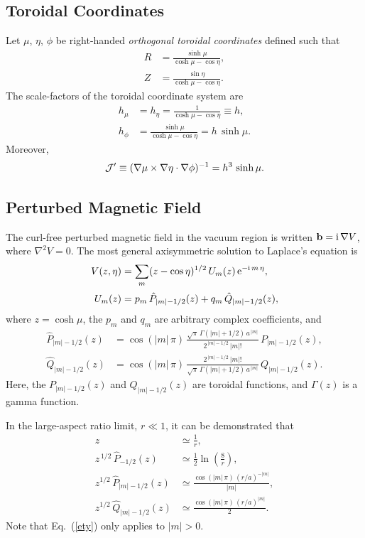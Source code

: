 \documentclass[12pt,prb,aps]{revtex4-1}
\begin{document}
\subsection{Toroidal Coordinates}
Let $\mu$, $\eta$, $\phi$ be right-handed {\em orthogonal toroidal coordinates}\/ defined such that\,\cite{tj,tj1,mf}
\begin{align}
R &= \frac{\sinh\mu}{\cosh\mu-\cos\eta},\\[0.5ex]
Z&=\frac{\sin\eta}{\cosh\mu-\cos\eta}.
\end{align}
The scale-factors of the toroidal coordinate system are
\begin{align}
h_\mu&=h_\eta= \frac{1}{\cosh\mu-\cos\eta}\equiv h,\\[0.5ex]
h_\phi &= \frac{\sinh\mu}{\cosh\mu-\cos\eta} = h\,\sinh\mu.
\end{align}
Moreover, 
\begin{equation}
{\cal J}' \equiv (\nabla\mu\times\nabla\eta\cdot\nabla\phi)^{-1}= h^3\,\sinh\mu.
\end{equation}

\subsection{Perturbed Magnetic Field}
The curl-free perturbed magnetic field in the vacuum region is written ${\bf b} = {\rm i}\,\nabla V$,
where
$\nabla^2 V =0$.
The most general axisymmetric  solution to Laplace's equation is\,\cite{tj1,mf1}
\begin{align}
V(z,\eta)&= \sum_m (z-\cos\eta)^{1/2}\,U_m(z)\,{\rm e}^{-{\rm i}\,m\,\eta}, \\[0.5ex]
U_m(z) &= p_m\,\hat{P}_{|m|-1/2}(z)+q_m\,\hat{Q}_{|m|-1/2}(z),
\end{align}
where  $z=\cosh\mu$, the $p_m$ and $q_m$ are arbitrary complex coefficients, and 
\begin{align}\label{e21dd}
\hat{P}_{|m|-1/2}(z) &= \cos(|m|\,\pi)\,\frac{\sqrt{\pi}\,\Gamma(|m|+1/2)\,a^{\,|m|}}{2^{\,|m|-1/2}\,|m|!}\,P_{|m|-1/2}(z),\\[0.5ex]
\hat{Q}_{|m|-1/2}(z)&= \cos(|m|\,\pi)\,\frac{2^{\,|m|-1/2}\,|m|!}{\sqrt{\pi}\,\Gamma(|m|+1/2)\,a^{\,|m|}}\,Q_{|m|-1/2}(z).\label{e22dd}
\end{align}
Here,  the $P_{|m|-1/2}(z)$  and $Q_{|m|-1/2}(z)$ are toroidal functions,\cite{as1} and $\Gamma(z)$ is a
gamma function.\cite{as2}

In the large-aspect ratio limit, $r\ll 1$, it can be demonstrated that\,\cite{mf2}
\begin{align}
z&\simeq \frac{1}{r},\label{e25t}\\[0.5ex]
z^{\,1/2}\,\hat{P}_{-1/2}(z) &\simeq \frac{1}{2}\ln\left(\frac{8}{r}\right),\\[0.5ex]
z^{1/2}\,\hat{P}_{|m|-1/2}(z) &\simeq \frac{\cos(|m|\,\pi)\,(r/a)^{-|m|}}{|m|},\label{ety}\\[0.5ex]
z^{1/2}\,\hat{Q}_{|m|-1/2}(z) &\simeq \frac{\cos(|m|\,\pi)\,(r/a)^{|m|}}{2}.\label{e29t}
\end{align}
Note that Eq.~(\ref{ety}) only applies to $|m|>0$.
\end{document}
